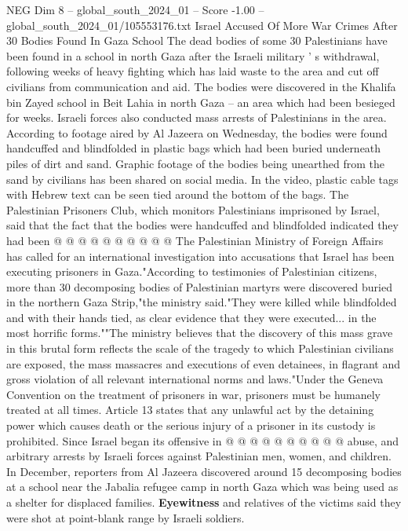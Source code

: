 \begin{textsample}{NEG Dim 8 – global\_south\_2024\_01 – Score -1.00 – global\_south\_2024\_01/105553176.txt}  \label{ex:f8_neg_174}
Israel Accused Of More War Crimes After 30 Bodies Found In Gaza School The dead bodies of some 30 Palestinians have been found in a school in north Gaza after the Israeli military ' s withdrawal, following weeks of heavy fighting which has laid waste to the area and cut off civilians from communication and aid.
The bodies were discovered in the Khalifa bin Zayed school in Beit Lahia in north Gaza -- an area which had been besieged for weeks.
Israeli forces also conducted mass arrests of Palestinians in the area.
According to footage aired by Al Jazeera on Wednesday, the bodies were found handcuffed and blindfolded in plastic bags which had been buried underneath piles of dirt and sand.
Graphic footage of the bodies being unearthed from the sand by civilians has been shared on social media.
In the video, plastic cable tags with Hebrew text can be seen tied around the bottom of the bags.
The Palestinian Prisoners Club, which monitors Palestinians imprisoned by Israel, said that the fact that the bodies were handcuffed and blindfolded indicated they had been @ @ @ @ @ @ @ @ @ @ The Palestinian Ministry of Foreign Affairs has called for an international investigation into accusations that Israel has been executing prisoners in Gaza."According to testimonies of Palestinian citizens, more than 30 decomposing bodies of Palestinian martyrs were discovered buried in the northern Gaza Strip,"the ministry said."They were killed while blindfolded and with their hands tied, as clear evidence that they were executed... in the most horrific forms.""The ministry believes that the discovery of this mass grave in this brutal form reflects the scale of the tragedy to which Palestinian civilians are exposed, the mass massacres and executions of even detainees, in flagrant and gross violation of all relevant international norms and laws."Under the Geneva Convention on the treatment of prisoners in war, prisoners must be humanely treated at all times.
Article 13 states that any unlawful act by the detaining power which causes death or the serious injury of a prisoner in its custody is prohibited.
Since Israel began its offensive in @ @ @ @ @ @ @ @ @ @ abuse, and arbitrary arrests by Israeli forces against Palestinian men, women, and children.
In December, reporters from Al Jazeera discovered around 15 decomposing bodies at a school near the Jabalia refugee camp in north Gaza which was being used as a shelter for displaced families. \textbf{Eyewitness} and relatives of the victims said they were shot at point-blank range by Israeli soldiers.

\end{textsample}
